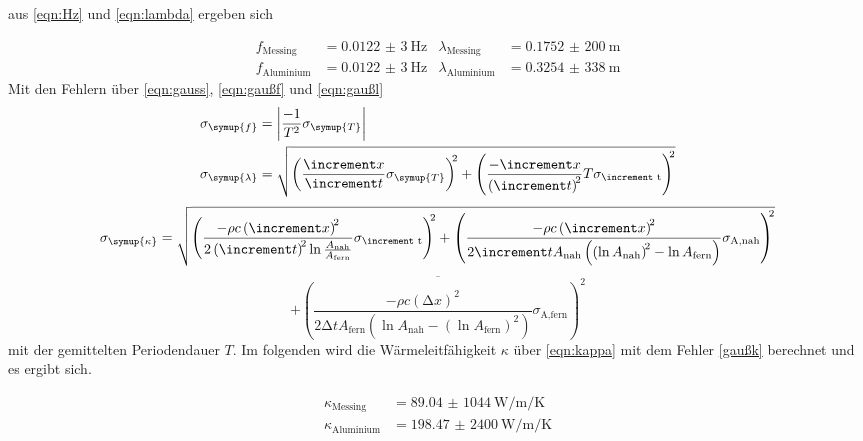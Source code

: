 aus \eqref{eqn:Hz} und \eqref{eqn:lambda} ergeben sich

\begin{align*}
  f_\text{Messing} &= \SI{0,0122(3)}{\hertz} & \lambda_\text{Messing} &= \SI{0,1752(200)}{\meter}\\
  f_\text{Aluminium} &= \SI{0,0122(3)}{\hertz} & \lambda_\text{Aluminium} &= \SI{0,3254(338)}{\meter}
\end{align*}
Mit den Fehlern über \eqref{eqn:gauss}, \eqref{eqn:gaußf} und \eqref{eqn:gaußl}
\begin{align}
  \sigma_\symup{f}&=\left|\frac{-1}{T^2}\sigma_\symup{T}\right|
  \label{eqn:gaußf}\\
  \sigma_\symup{\lambda}&=\sqrt{\left(\frac{\increment x}{\increment t}\sigma_\symup{T}\right)^{\!\!2}
    +\left(\frac{-\increment x}{\left(\increment t\right)^{\!2}}T\sigma_\text{\increment t}\right)^{\!\!2}}
  \label{eqn:gaußl}
\end{align}
\begin{equation*}
    \sigma_\symup{\kappa} = \sqrt{
    \left(\frac{-\rho c\left(\increment x\right)^{\!2}}{2\left(\increment t\right)^{\!2}\ln{\frac{A_\text{nah}}{A_\text{fern}}}}\sigma_\text{\increment t}\right)^{\!\!2}
    +\left(\frac{-\rho c\left(\increment x\right)^{\!2}}{2 \increment t A_\text{nah}\left(\left(\ln{A_\text{nah}}\right)^{\!2}-\ln{A_\text{fern}}\right)}\sigma_\text{A,nah}\right)^{\!\!2}}\\
\end{equation*}
\begin{equation}
  \overline{+\left(\frac{-\rho c\left(\increment x\right)^{\!2}}{2 \increment t A_\text{fern}\left(\ln{A_\text{nah}}-\left(\ln{A_\text{fern}}\right)^{\!2}\right)}\sigma_\text{A,fern}\right)^{\!\!2}}
  \label{gaußk}
\end{equation}
mit der gemittelten Periodendauer $T$. Im folgenden wird die Wärmeleitfähigkeit $\kappa$ über \eqref{eqn:kappa}
mit dem Fehler \eqref{gaußk} berechnet und es ergibt sich.

\begin{align*}
  \kappa_\text{Messing} &= \SI{89,04(1044)}{\watt\per\meter\per\kelvin}\\
  \kappa_\text{Aluminium} &= \SI{198,47(2400)}{\watt\per\meter\per\kelvin}
\end{align*}

